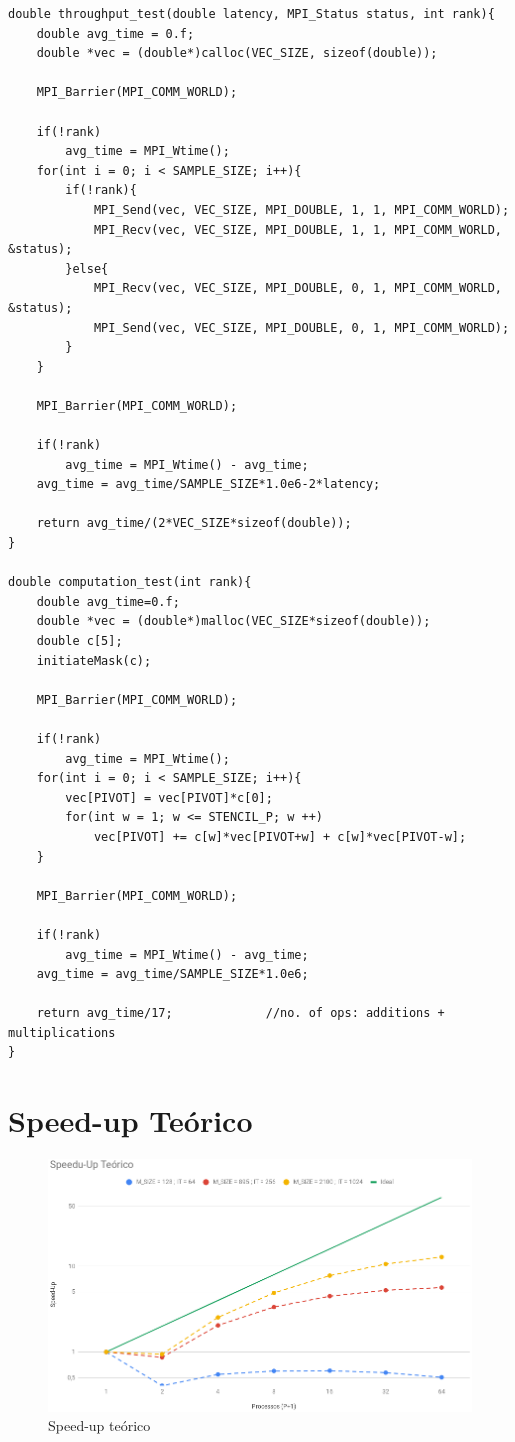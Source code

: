 \documentclass{article}
\begin{document}
\begin{appendices}
\begin{verbatim}
double throughput_test(double latency, MPI_Status status, int rank){
    double avg_time = 0.f;
    double *vec = (double*)calloc(VEC_SIZE, sizeof(double));
    
    MPI_Barrier(MPI_COMM_WORLD);

    if(!rank)
        avg_time = MPI_Wtime();
    for(int i = 0; i < SAMPLE_SIZE; i++){
        if(!rank){
            MPI_Send(vec, VEC_SIZE, MPI_DOUBLE, 1, 1, MPI_COMM_WORLD);
            MPI_Recv(vec, VEC_SIZE, MPI_DOUBLE, 1, 1, MPI_COMM_WORLD, &status);
        }else{
            MPI_Recv(vec, VEC_SIZE, MPI_DOUBLE, 0, 1, MPI_COMM_WORLD, &status);
            MPI_Send(vec, VEC_SIZE, MPI_DOUBLE, 0, 1, MPI_COMM_WORLD);
        }
    }

    MPI_Barrier(MPI_COMM_WORLD);

    if(!rank)
        avg_time = MPI_Wtime() - avg_time;
    avg_time = avg_time/SAMPLE_SIZE*1.0e6-2*latency;

    return avg_time/(2*VEC_SIZE*sizeof(double));
}

double computation_test(int rank){
    double avg_time=0.f;
    double *vec = (double*)malloc(VEC_SIZE*sizeof(double));
    double c[5];
    initiateMask(c);

    MPI_Barrier(MPI_COMM_WORLD);

    if(!rank)
        avg_time = MPI_Wtime();
    for(int i = 0; i < SAMPLE_SIZE; i++){
        vec[PIVOT] = vec[PIVOT]*c[0];
        for(int w = 1; w <= STENCIL_P; w ++)
            vec[PIVOT] += c[w]*vec[PIVOT+w] + c[w]*vec[PIVOT-w];
    }

    MPI_Barrier(MPI_COMM_WORLD);

    if(!rank)
        avg_time = MPI_Wtime() - avg_time;
    avg_time = avg_time/SAMPLE_SIZE*1.0e6;

    return avg_time/17;             //no. of ops: additions + multiplications
}   
\end{verbatim}

\section{Speed-up Teórico}
\label{theoretical_g}
\begin{figure}[H]
    \centering
    \includegraphics[width=15cm]{Pictures/TheoreticalGraph.png}
    \caption{Speed-up teórico}
\end{figure}


\end{appendices}
\end{document}
